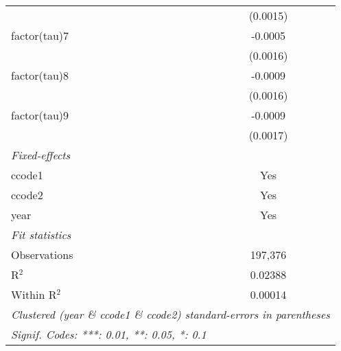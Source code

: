 \begin{tabular}{lc}
                       & (0.0015)\\   
   factor(tau)7        & -0.0005\\   
                       & (0.0016)\\   
   factor(tau)8        & -0.0009\\   
                       & (0.0016)\\   
   factor(tau)9        & -0.0009\\   
                       & (0.0017)\\   
   \midrule
   \emph{Fixed-effects}\\
   ccode1              & Yes\\  
   ccode2              & Yes\\  
   year                & Yes\\  
   \midrule
   \emph{Fit statistics}\\
   Observations        & 197,376\\  
   R$^2$               & 0.02388\\  
   Within R$^2$        & 0.00014\\  
   \midrule \midrule
   \multicolumn{2}{l}{\emph{Clustered (year \& ccode1 \& ccode2) standard-errors in parentheses}}\\
   \multicolumn{2}{l}{\emph{Signif. Codes: ***: 0.01, **: 0.05, *: 0.1}}\\
\end{tabular}
\par\endgroup



